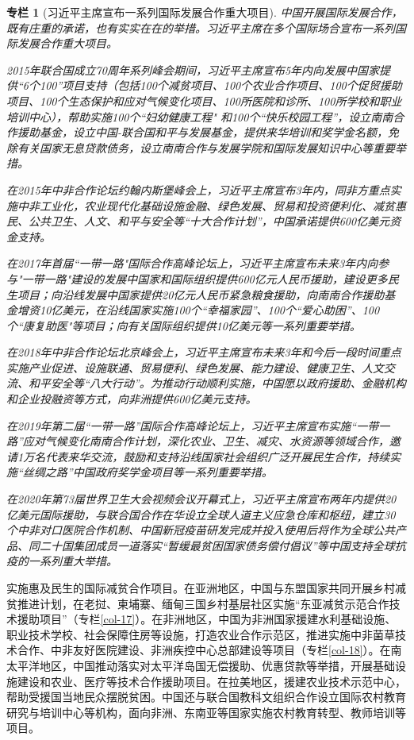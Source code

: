 \documentclass{ctexart}
\newtheorem{zhuanlan}{专栏}
\begin{document}
\begin{zhuanlan}[习近平主席宣布一系列国际发展合作重大项目]
    中国开展国际发展合作，既有庄重的承诺，也有实实在在的举措。习近平主席在多个国际场合宣布一系列国际发展合作重大项目。

    2015年联合国成立70周年系列峰会期间，习近平主席宣布5年内向发展中国家提供“6个100”项目支持（包括100个减贫项目、100个农业合作项目、100个促贸援助项目、100个生态保护和应对气候变化项目、100所医院和诊所、100所学校和职业培训中心），帮助实施100个“妇幼健康工程" 和100个“快乐校园工程”，设立南南合作援助基金，设立中国-联合国和平与发展基金，提供来华培训和奖学金名额，免除有关国家无息贷款债务，设立南南合作与发展学院和国际发展知识中心等重要举措。

    在2015年中非合作论坛约翰内斯堡峰会上，习近平主席宣布3年内，同非方重点实施中非工业化，农业现代化基础设施金融、绿色发展、贸易和投资便利化、减贫惠民、公共卫生、人文、和平与安全等“十大合作计划”，中国承诺提供600亿美元资金支持。

    在2017年首届“一带一路"国际合作高峰论坛上，习近平主席宣布未来3年内向参与"一带一路"建设的发展中国家和国际组织提供600亿元人民币援助，建设更多民生项目；向沿线发展中国家提供20亿元人民币紧急粮食援助，向南南合作援助基金增资10亿美元，在沿线国家实施100个“幸福家园”、100个“爱心助困”、100个“康复助医"等项目；向有关国际组织提供10亿美元等一系列重要举措。

    在2018年中非合作论坛北京峰会上，习近平主席宣布未来3年和今后一段时间重点实施产业促进、设施联通、贸易便利、绿色发展、能力建设、健康卫生、人文交流、和平安全等“八大行动”。为推动行动顺利实施，中国愿以政府援助、金融机构和企业投融资等方式，向非洲提供600亿美元支持。

    在2019年第二届“一带一路”国际合作高峰论坛上，习近平主席宣布实施“一带一路”应对气候变化南南合作计划，深化农业、卫生、减灾、水资源等领域合作，邀请1万名代表来华交流，鼓励和支持沿线国家社会组织广泛开展民生合作，持续实施“丝绸之路”中国政府奖学金项目等一系列重要举措。

    在2020年第73届世界卫生大会视频会议开幕式上，习近平主席宣布两年内提供20亿美元国际援助，与联合国合作在华设立全球人道主义应急仓库和枢纽，建立30个中非对口医院合作机制、中国新冠疫苗研发完成并投入使用后将作为全球公共产品、同二十国集团成员一道落实“暂缓最贫困国家债务偿付倡议”等中国支持全球抗疫的一系列重大举措。
    \label{col-16}
\end{zhuanlan}

实施惠及民生的国际减贫合作项目。在亚洲地区，中国与东盟国家共同开展乡村减贫推进计划，在老挝、柬埔寨、缅甸三国乡村基层社区实施“东亚减贫示范合作技术援助项目”（专栏\ref{col-17}）。在非洲地区，中国为非洲国家援建水利基础设施、职业技术学校、社会保障住房等设施，打造农业合作示范区，推进实施中非菌草技术合作、中非友好医院建设、非洲疾控中心总部建设等项目（专栏\ref{col-18}）。在南太平洋地区，中国推动落实对太平洋岛国无偿援助、优惠贷款等举措，开展基础设施建设和农业、医疗等技术合作援助项目。在拉美地区，援建农业技术示范中心，帮助受援国当地民众摆脱贫困。中国还与联合国教科文组织合作设立国际农村教育研究与培训中心等机构，面向非洲、东南亚等国家实施农村教育转型、教师培训等项目。
\end{document}
